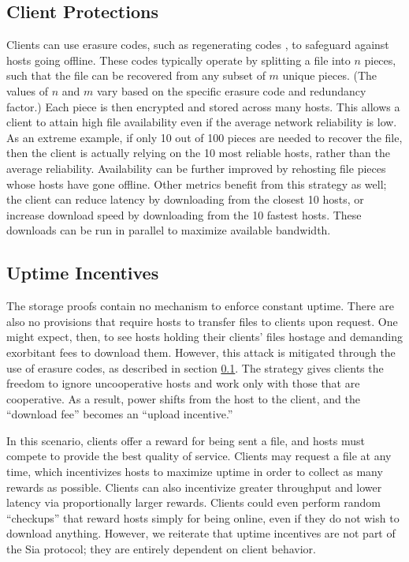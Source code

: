 \documentclass[twocolumn]{article}
\begin{document}
\subsection{Client Protections}
\label{subsec:client-protect}
Clients can use erasure codes, such as regenerating codes \cite{reg}, to safeguard against hosts going offline.
These codes typically operate by splitting a file into $n$ pieces, such that the file can be recovered from any subset of $m$ unique pieces.
(The values of $n$ and $m$ vary based on the specific erasure code and redundancy factor.)
Each piece is then encrypted and stored across many hosts.
This allows a client to attain high file availability even if the average network reliability is low.
As an extreme example, if only 10 out of 100 pieces are needed to recover the file, then the client is actually relying on the 10 most reliable hosts, rather than the average reliability.
Availability can be further improved by rehosting file pieces whose hosts have gone offline.
Other metrics benefit from this strategy as well; the client can reduce latency by downloading from the closest 10 hosts, or increase download speed by downloading from the 10 fastest hosts.
These downloads can be run in parallel to maximize available bandwidth.

\subsection{Uptime Incentives}
\label{sec:uptime}
The storage proofs contain no mechanism to enforce constant uptime.
There are also no provisions that require hosts to transfer files to clients upon request.
One might expect, then, to see hosts holding their clients' files hostage and demanding exorbitant fees to download them.
However, this attack is mitigated through the use of erasure codes, as described in section \ref{subsec:client-protect}.
The strategy gives clients the freedom to ignore uncooperative hosts and work only with those that are cooperative.
As a result, power shifts from the host to the client, and the ``download fee'' becomes an ``upload incentive.''

In this scenario, clients offer a reward for being sent a file, and hosts must compete to provide the best quality of service.
Clients may request a file at any time, which incentivizes hosts to maximize uptime in order to collect as many rewards as possible.
Clients can also incentivize greater throughput and lower latency via proportionally larger rewards.
Clients could even perform random ``checkups'' that reward hosts simply for being online, even if they do not wish to download anything.
However, we reiterate that uptime incentives are not part of the Sia protocol; they are entirely dependent on client behavior.
\end{document}
